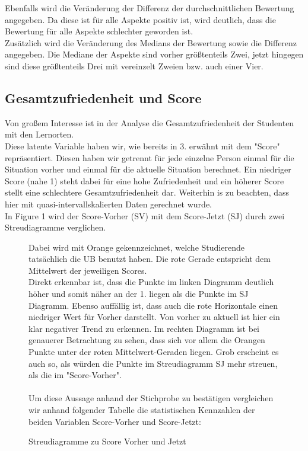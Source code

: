 \documentclass[11pt, a4paper]{article}
\begin{document}
Ebenfalls wird die Veränderung der Differenz der durchschnittlichen Bewertung angegeben. Da diese ist für alle Aspekte positiv ist, wird deutlich, dass die Bewertung für alle Aspekte schlechter geworden ist.\\
Zusätzlich wird die Veränderung des Medians der Bewertung sowie die Differenz angegeben.
Die Mediane der Aspekte sind vorher größtenteils Zwei, jetzt hingegen sind diese größtenteils Drei mit vereinzelt Zweien bzw. auch einer Vier. %



\subsection{Gesamtzufriedenheit und Score}



Von großem Interesse ist in der Analyse die Gesamtzufriedenheit der Studenten mit den Lernorten.\\ Diese latente Variable haben wir, wie bereits in 3. erwähnt mit dem "Score" repräsentiert.
Diesen haben wir getrennt für jede einzelne Person einmal für die Situation vorher und einmal für die aktuelle Situation berechnet.
Ein niedriger Score (nahe 1) steht dabei für eine hohe Zufriedenheit und ein höherer Score stellt eine schlechtere Gesamtzufriedenheit dar.
Weiterhin is zu beachten, dass hier mit quasi-intervallskalierten Daten gerechnet wurde. \\
In Figure 1 wird der Score-Vorher (SV) mit dem Score-Jetzt (SJ) durch zwei Streudiagramme verglichen.
\vspace{-0.5cm}
\begin{figure}[h]
{\centering 
\vspace{-2.9cm}
\caption{Streudiagramme zu Score Vorher und Jetzt}}
\vspace{0.3cm}
Dabei wird mit Orange gekennzeichnet, welche Studierende tatsächlich die UB benutzt haben. Die rote Gerade entspricht dem Mittelwert der jeweiligen Scores. \\
Direkt erkennbar ist, dass die Punkte im linken Diagramm deutlich höher und somit näher an der 1. liegen als die Punkte im SJ Diagramm.
Ebenso auffällig ist, dass auch die rote Horizontale einen niedriger Wert für Vorher darstellt. 
Von vorher zu aktuell ist hier ein klar negativer Trend zu erkennen.
Im rechten Diagramm ist bei genauerer Betrachtung zu sehen, dass sich vor allem die Orangen Punkte unter der roten Mittelwert-Geraden liegen.
Grob erscheint es auch so, als würden die Punkte im Streudiagramm SJ mehr streuen, als die im "Score-Vorher".\\\\
Um diese Aussage anhand der Stichprobe zu bestätigen vergleichen wir anhand folgender Tabelle die statistischen Kennzahlen der beiden Variablen Score-Vorher und Score-Jetzt:\\
\end{figure}
\end{document}
